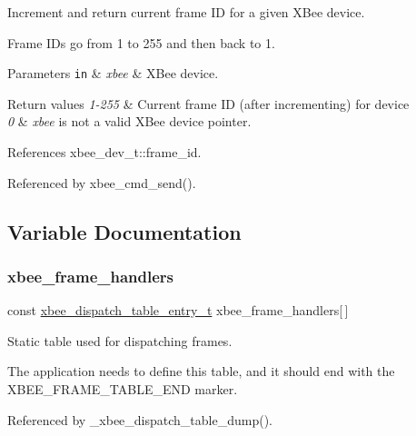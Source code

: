 Increment and return current frame ID for a given X\+Bee device. 

Frame I\+Ds go from 1 to 255 and then back to 1.


\begin{DoxyParams}[1]{Parameters}
\mbox{\tt in}  & {\em xbee} & X\+Bee device.\\
\hline
\end{DoxyParams}

\begin{DoxyRetVals}{Return values}
{\em 1-\/255} & Current frame ID (after incrementing) for device \\
\hline
{\em 0} & {\itshape xbee} is not a valid X\+Bee device pointer. \\
\hline
\end{DoxyRetVals}


References xbee\+\_\+dev\+\_\+t\+::frame\+\_\+id.



Referenced by xbee\+\_\+cmd\+\_\+send().



\subsection{Variable Documentation}
\mbox{\label{group__xbee__device_ga1a91a1dc6e99737715fbf882842872c5}} 
\subsubsection{\texorpdfstring{xbee\+\_\+frame\+\_\+handlers}{xbee\_frame\_handlers}}
{\footnotesize\ttfamily const \hyperlink{structxbee__dispatch__table__entry__t}{xbee\+\_\+dispatch\+\_\+table\+\_\+entry\+\_\+t} xbee\+\_\+frame\+\_\+handlers\mbox{[}$\,$\mbox{]}}



Static table used for dispatching frames. 

The application needs to define this table, and it should end with the X\+B\+E\+E\+\_\+\+F\+R\+A\+M\+E\+\_\+\+T\+A\+B\+L\+E\+\_\+\+E\+ND marker. 

Referenced by \+\_\+xbee\+\_\+dispatch\+\_\+table\+\_\+dump().

